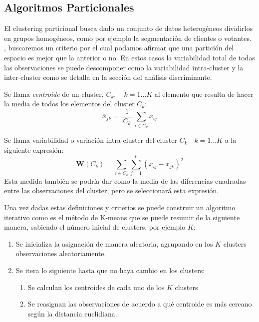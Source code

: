 \subsection{Algoritmos Particionales}

\noindent El clustering particional busca dado un conjunto de datos heterogéneos dividirlos en grupos homogéneos, como por ejemplo la segmentación de clientes o votantes.
, buscaremos un criterio por el cual podamos afirmar que una partición del espacio es mejor que la anterior o no. En estos casos la variabilidad total de todas las observaciones se puede descomponer como la variabilidad intra-cluster y la inter-cluster como se detalla en la sección del análisis discriminante.

\begin{defi}
Se llama \emph{centroide} de un cluster, $C_k,\quad k=1\ldots K$ al elemento que resulta de hacer la media de todos los elementos del cluster $C_k$:
\begin{equation}
\overline{x}_{jk}=\dfrac{1}{|C_k|}\sum_{i\in C_k} x_{ij}
\end{equation}
\end{defi}

\begin{defi}
Se llama variabilidad o variación intra-cluster del cluster $C_k\quad k=1\ldots K$ a la siguiente expresión:
\begin{equation}
\mathbf{W}(C_k)=\sum_{i\in C_k}\sum_{j=1}^{p} (x_{ij}-\overline{x}_{jk})^2
\end{equation}
\noindent Esta medida también se podría dar como la media de las diferencias cuadradas entre las observaciones del cluster, pero se seleccionará esta expresión. 
\end{defi}

\noindent Una vez dadas estas definiciones y criterios se puede construir un algoritmo iterativo como es el método de K-means que se puede resumir de la siguiente manera, sabiendo el número inicial de clusters, por ejemplo $K$:
\begin{enumerate}
\item Se inicializa la asignación de manera aleatoria, agrupando en los $K$ clusters observaciones aleatoriamente. 
\item Se itera lo siguiente hasta que no haya cambio en los clusters:
\begin{enumerate}
\item Se calculan los centroides de cada uno de los $K$ clusters
\item Se reasignan las observaciones de acuerdo a qué centroide es más cercano según la distancia euclidiana. 
\end{enumerate}
\end{enumerate}

